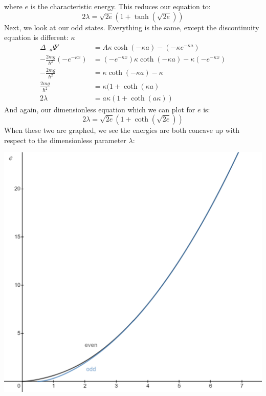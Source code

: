 \begin{sol}
\begin{enumerate}[label=\textbf{(\alph*)}]
where $e$ is the characteristic energy. This reduces our equation to:
$$2\lambda=\sqrt{2e}(1+\tanh(\sqrt{2e}))$$
Next, we look at our odd states. Everything is the same, except the discontinuity equation is different:
$\kappa$
\begin{align*}
    \Delta_{-a}\Psi' &= A\kappa\cosh(-\kappa a)-\left(-\kappa e^{-\kappa a}\right) \\
    -\frac{2mg}{\hbar^2}\left(-e^{-\kappa x}\right)&= \left(-e^{-\kappa x}\right)\kappa \coth(-\kappa a) - \kappa \left(-e^{-\kappa x}\right) \\
    -\frac{2mg}{\hbar^2} &= \kappa \coth(-\kappa a) - \kappa \\
    \frac{2mg}{\hbar^2} &= \kappa(1+\coth(\kappa a) \\
    2\lambda &= a\kappa(1+\coth(a\kappa))
\end{align*}
And again, our dimensionless equation which we can plot for $e$ is:
$$2\lambda=\sqrt{2e}(1+\coth(\sqrt{2e}))$$
When these two are graphed, we see the energies are both concave up with respect to the dimensionless parameter $\lambda$:
\begin{center}
    \includegraphics[width=0.6\linewidth]{Images/7-1.png}
\end{center}



\end{enumerate}
\end{sol}
